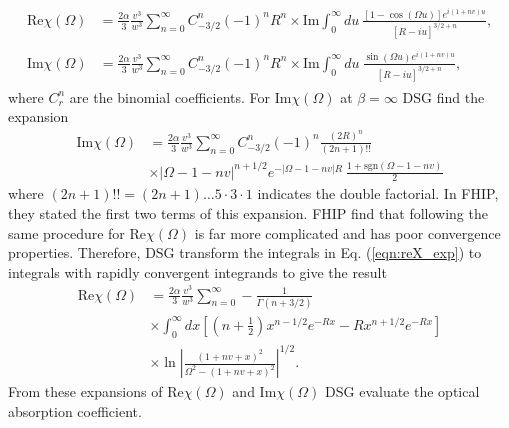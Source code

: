 \begin{subequations}
    \begin{align}
    \begin{split}
        \text{Re} \chi(\Omega) &= \frac{2\alpha}{3} \frac{v^3}{w^3} \sum_{n = 0}^\infty C^n_{-3/2} (-1)^n R^n \times \text{Im} \int^{\infty}_0 du\ \frac{\left[1 - \cos(\Omega u)\right] e^{i(1+nv)u}}{\left[R - iu\right]^{3/2 + n}},
    \end{split}\\
    \begin{split}\label{eqn:reX_exp}
        \text{Im} \chi(\Omega) &= \frac{2\alpha}{3} \frac{v^3}{w^3} \sum_{n = 0}^\infty C^n_{-3/2} (-1)^n R^n \times \text{Im} \int^{\infty}_0 du\ \frac{\sin(\Omega u) e^{i(1+nv)u}}{\left[R - iu\right]^{3/2 + n}},
    \end{split}
    \end{align}
\end{subequations}
where $C^n_r$ are the binomial coefficients. For $\text{Im}\chi(\Omega)$ at $\beta = \infty$ DSG find the expansion
\begin{equation}
    \begin{split}
        \textrm{Im}\chi(\Omega) &= \frac{2\alpha}{3} \frac{v^3}{w^3} \sum_{n=0}^\infty C^n_{-3/2} (-1)^n \frac{(2R)^n}{(2n + 1)!!} \\
        &\times |\Omega -1 - nv|^{n + 1/2} e^{-|\Omega - 1 -nv|R}\ \frac{1 + \textrm{sgn}(\Omega - 1 - nv)}{2}
    \end{split}
\end{equation}
where $(2n + 1)!! = (2n + 1) \dots 5 \cdot 3 \cdot 1$ indicates the double factorial. In FHIP, they stated the first two terms of this expansion. FHIP find that following the same procedure for $\text{Re}\chi(\Omega)$ is far more complicated and has poor convergence properties. Therefore, DSG transform the integrals in Eq. (\ref{eqn:reX_exp}) to integrals with rapidly convergent integrands to give the result
\begin{equation}
    \begin{split}
    \textrm{Re}\chi(\Omega) &= \frac{2\alpha}{3} \frac{v^3}{w^3} \sum_{n=0}^\infty -\frac{1}{\Gamma(n + 3/2)} \\
    &\times\int_0^\infty dx \left[ \left(n + \frac{1}{2}\right) x^{n-1/2} e^{-Rx} - R x^{n + 1/2} e^{-Rx} \right] \\
    &\times \ln{\left| \frac{(1 + nv + x)^2}{\Omega^2 - (1 + nv + x)^2} \right|^{1/2}}.
    \end{split}
\end{equation}
From these expansions of $\text{Re}\chi(\Omega)$ and $\text{Im}\chi(\Omega)$ DSG evaluate the optical absorption coefficient. 

